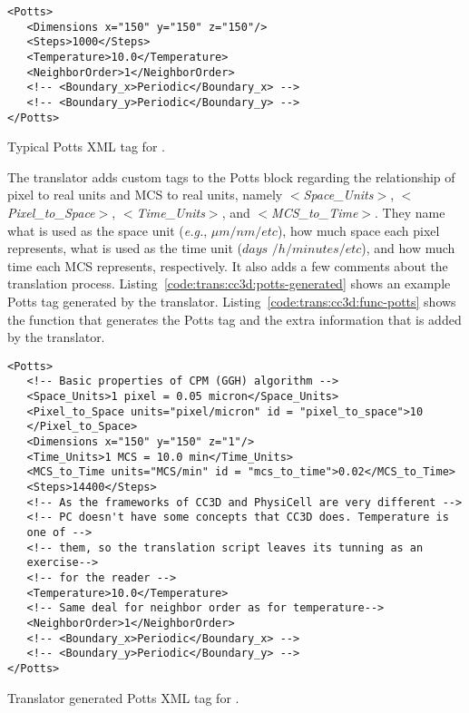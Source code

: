 \begin{listing}[H]%
\begin{verbatim}
<Potts>
   <Dimensions x="150" y="150" z="150"/>
   <Steps>1000</Steps>
   <Temperature>10.0</Temperature>
   <NeighborOrder>1</NeighborOrder>
   <!-- <Boundary_x>Periodic</Boundary_x> -->
   <!-- <Boundary_y>Periodic</Boundary_y> -->
</Potts>
\end{verbatim}
\caption{Typical Potts XML tag for \ccd.}\label{code:trans:cc3d:potts}
\end{listing}

The translator adds custom tags to the Potts block regarding the relationship of pixel to real units and MCS to real units, namely \textit{$<$Space\_Units$>$}, \textit{$<$Pixel\_to\_Space$>$}, \textit{$<$Time\_Units$>$}, and \textit{$<$MCS\_to\_Time$>$}. They name what is used as the space unit (\textit{e.g.}, $\mu m/nm/etc$), how much space each pixel represents, what is used as the time unit ($days$ $/h/minutes$$/etc$), and how much time each MCS represents, respectively. It also adds a few comments about the translation process. Listing~\ref{code:trans:cc3d:potts-generated} shows an example Potts tag generated by the translator. Listing~\ref{code:trans:cc3d:func-potts} shows the function that generates the Potts tag and the extra information that is added by the translator.

\begin{listing}[H]%
\begin{verbatim}
<Potts>
   <!-- Basic properties of CPM (GGH) algorithm -->
   <Space_Units>1 pixel = 0.05 micron</Space_Units>
   <Pixel_to_Space units="pixel/micron" id = "pixel_to_space">10
   </Pixel_to_Space>
   <Dimensions x="150" y="150" z="1"/>
   <Time_Units>1 MCS = 10.0 min</Time_Units>
   <MCS_to_Time units="MCS/min" id = "mcs_to_time">0.02</MCS_to_Time>
   <Steps>14400</Steps>
   <!-- As the frameworks of CC3D and PhysiCell are very different -->
   <!-- PC doesn't have some concepts that CC3D does. Temperature is 
   one of -->
   <!-- them, so the translation script leaves its tunning as an 
   exercise-->
   <!-- for the reader -->
   <Temperature>10.0</Temperature>
   <!-- Same deal for neighbor order as for temperature-->
   <NeighborOrder>1</NeighborOrder>
   <!-- <Boundary_x>Periodic</Boundary_x> -->
   <!-- <Boundary_y>Periodic</Boundary_y> -->
</Potts>
\end{verbatim}
\caption{Translator generated Potts XML tag for \ccd.}\label{code:trans:cc3d:potts-generated}
\end{listing}


